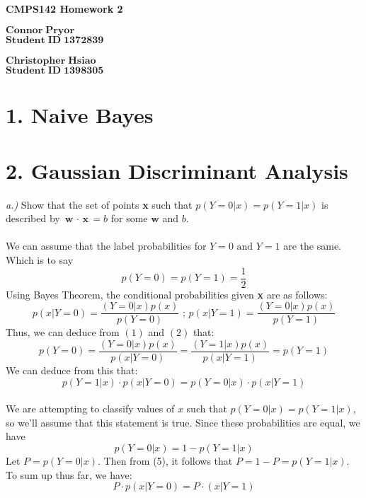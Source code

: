 \documentclass[11pt]{article}
\begin{document}
\begin{center}
{\bf\Large CMPS142 Homework 2}
\end{center}
\noindent $\mathbf{Connor\;Pryor}$\\
\noindent $\mathbf{Student\;ID\;1372839}$\\
\\
\noindent $\mathbf{Christopher\;Hsiao}$\\
\noindent $\mathbf{Student\;ID\;1398305}$\\

\section*{1. Naive Bayes}

\section*{2. Gaussian Discriminant Analysis}
\noindent \textit{a.)} Show that the set of points \textbf{x} such that $p(Y = 0 | x) = p(Y = 1 | x )$ is described by $\textbf{w $\cdot$ x} = b$ for some $\textbf{w}$ and $b$.\\ \\
We can assume that the label probabilities for $Y = 0 \text{ and } Y = 1$ are the same. Which is to say
\begin{equation}p(Y = 0) = p(Y = 1) = \frac{1}{2}\end{equation}
Using Bayes Theorem, the conditional probabilities given \textbf{x} are as follows:
\begin{equation}p(x | Y = 0) = \frac{(Y = 0 | x)p(x)}{p(Y = 0)} \text{ ;   } p(x | Y = 1) = \frac{(Y = 0 | x)p(x)}{p(Y = 1)}\end{equation}
Thus, we can deduce from $(1)$ and $(2)$ that:
\begin{equation}p(Y = 0) = \frac{(Y = 0 | x)p(x)}{p(x | Y = 0)} = \frac{(Y = 1 | x)p(x)}{p(x | Y = 1)} = p(Y=1)\end{equation}
We can deduce from this that:
\begin{equation}p(Y = 1 | x) \cdot p(x | Y=0) = p(Y = 0 | x) \cdot p(x | Y=1)\end{equation}
\\
We are attempting to classify values of $x$ such that $p(Y = 0 | x) = p(Y = 1 | x)$, so we'll assume that this statement is true.
Since these probabilities are equal, we have 
\begin{equation}p(Y = 0 | x) = 1 - p(Y = 1 | x)\end{equation}
Let $P = p(Y = 0|x)$. Then from (5), it follows that $P = 1 - P = p(Y = 1 | x)$.\\
To sum up thus far, we have:
\begin{equation}P \cdot p(x | Y = 0) =  P \cdot (x | Y = 1)\end{equation}
\end{document}
